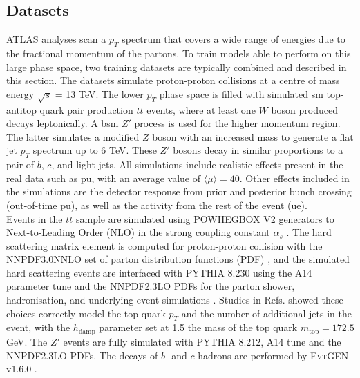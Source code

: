 \subsection{Datasets}\label{ftagdatasets}
ATLAS analyses scan a $p_T$ spectrum that covers a wide range of energies due to the fractional momentum of the partons. To train models able to perform on this large phase space, two training datasets are typically combined and described in this section. The datasets simulate proton-proton collisions at a centre of mass energy $\sqrt{s}$ = 13 TeV. The lower $p_T$ phase space is filled with simulated \gls{sm} top-antitop quark pair production $t\bar{t}$ events, where at least one $W$ boson produced decays leptonically. A \gls{bsm} $Z'$ process is used for the higher momentum region. The latter simulates a modified $Z$ boson with an increased mass to generate a flat jet $p_T$ spectrum up to 6 TeV. These $Z'$ bosons decay in similar proportions to a pair of $b$, $c$, and light-jets. All simulations include realistic effects present in the real data such as \gls{pu}, with an average value of $ \langle\mu\rangle = 40$. Other effects included in the simulations are the detector response from prior and posterior bunch crossing (out-of-time \gls{pu}), as well as the activity from the rest of the event (\gls{ue}). \\

Events in the $t\bar{t}$ sample are simulated using \textsc{POWHEGBOX V2} generators to Next-to-Leading Order (NLO) in the strong coupling constant $\alpha_s$ \cite{PaoloNason_2004, StefanoFrixione_2007, StefanoFrixione_20072, POWHEGBOX}. The hard scattering matrix element is computed for proton-proton collision with the \textsc{NNPDF3.0NNLO} set of parton distribution functions (PDF) \cite{PDFLHCrun2}, and the simulated hard scattering events are interfaced with \textsc{PYTHIA 8.230} \cite{SJOSTRAND2015159} using the A14 parameter tune \cite{ATL-PHYS-PUB-2014-021} and the \textsc{NNPDF2.3LO} PDFs for the parton shower, hadronisation, and underlying event simulations \cite{BALL2013244}. Studies in Refs. \cite{ATL-PHYS-PUB-2016-020, ATL-PHYS-PUB-2020-023} showed these choices correctly model the top quark $p_T$ and the number of additional jets in the event, with the $h_{\textrm{damp}}$ parameter set at 1.5 the mass of the top quark $m_{\textrm{top}} = 172.5$ GeV. The $Z'$ events are fully simulated with \textsc{PYTHIA 8.212}, A14 tune and the \textsc{NNPDF2.3LO} PDFs. The decays of $b$- and $c$-hadrons are performed by \textsc{EvtGEN} v1.6.0 \cite{LANGE2001152}. \\


